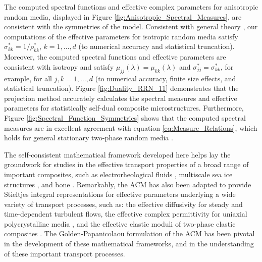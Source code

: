 \documentclass{cmslatex}
\renewcommand{\theequation}{\arabic{section}.\arabic{equation}}
\begin{document}
The computed spectral functions and effective complex parameters for
anisotropic random media, displayed in Figure
\ref{fig:Anisotropic_Spectral_Measures},  are consistent with the
symmetries of the model. Consistent with general theory
\cite{MILTON:2002:TC}, our computations of the effective parameters
for isotropic random media 
satisfy $\sigma^*_{kk}=1/\rho^*_{kk}$, $k=1,\ldots,d$ (to numerical accuracy and
statistical truncation). Moreover, the computed spectral functions and
effective parameters are consistent with isotropy and satisfy
$\mu_{jj}(\lambda)=\mu_{kk}(\lambda)$ and $\sigma^*_{jj}=\sigma^*_{kk}$, for example, for all
$j,k=1,\ldots,d$ (to numerical accuracy, finite size effects, and
statistical truncation). Figure
\ref{fig:Duality_RRN_11} demonstrates that the projection method
accurately calculates the spectral measures and 
effective parameters for statistically self-dual composite
microstructures. Furthermore, Figure
\ref{fig:Spectral_Function_Symmetries} shows that the computed 
spectral measures are in excellent agreement with equation
\eqref{eq:Measure_Relations}, which holds for general stationary
two-phase random media \cite{Murphy:JMP:063506}. 



The self-consistent mathematical framework developed here helps lay
the groundwork for studies in the effective transport properties of a
broad range of important composites, such as electrorheological
fluids \cite{Murphy_Thermo_Stat_Mech}, multiscale sea ice structures
\cite{Murphy_Multiscale_Sea_Ice}, and bone
\cite{Golden:JBM:337}. Remarkably, the ACM  has also been
adapted to provide Stieltjes integral representations for 
effective parameters underlying a wide variety of transport processes,
such as: the effective diffusivity for steady
\cite{McLaughlin:SIAM_JAM:780,Avellaneda:CMP-339,Murphy_Advective_Diffusion}
and time-dependent \cite{Avellaneda:PRE:3249} turbulent flows, the
effective complex permittivity for uniaxial polycrystalline media 
\cite{Barabash:JPCM:10323,Gully_Golden_Polycrystalline}, and the
effective elastic moduli of two-phase elastic composites
\cite{Ou:2012:411,Ou:MMAS:655}. The Golden-Papanicolaou formulation of
the ACM has been pivotal in the development of these mathematical
frameworks, and in the understanding of these important transport
processes. 



  \setcounter{equation}{1}  %
  \setcounter{section}{0}  %
  \renewcommand{\theequation}{A-\arabic{equation}} 
\renewcommand{\thesection}{A-\arabic{section}}
\end{document}
